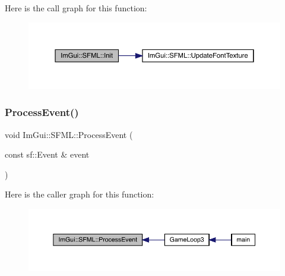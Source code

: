 Here is the call graph for this function\+:
\nopagebreak
\begin{figure}[H]
\begin{center}
\leavevmode
\includegraphics[width=350pt]{d1/d76/namespace_im_gui_1_1_s_f_m_l_a52384615894fc35d07dfaccb1bcdb514_cgraph}
\end{center}
\end{figure}
\mbox{\label{namespace_im_gui_1_1_s_f_m_l_a2086627a77c5a874cd299060b5f1c270}} 
\subsubsection{\texorpdfstring{Process\+Event()}{ProcessEvent()}}
{\footnotesize\ttfamily void Im\+Gui\+::\+S\+F\+M\+L\+::\+Process\+Event (\begin{DoxyParamCaption}\item[{const sf\+::\+Event \&}]{event }\end{DoxyParamCaption})}

Here is the caller graph for this function\+:
\nopagebreak
\begin{figure}[H]
\begin{center}
\leavevmode
\includegraphics[width=350pt]{d1/d76/namespace_im_gui_1_1_s_f_m_l_a2086627a77c5a874cd299060b5f1c270_icgraph}
\end{center}
\end{figure}
\mbox{\label{namespace_im_gui_1_1_s_f_m_l_a850ba18f010cf284347e6cbc2abb8dc4}} 
